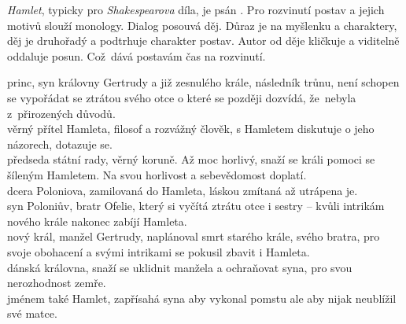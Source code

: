 \documentclass[../main.tex]{subfiles}
\begin{document}


\noindent\textit{Hamlet}, typicky pro \textit{Shakespearova} díla, je psán .
Pro rozvinutí postav a jejich motivů slouží monology.
Dialog posouvá děj.
Důraz je na myšlenku a charaktery, děj je druhořadý a podtrhuje charakter postav.
Autor od děje kličkuje a viditelně oddaluje posun.
Což~dává postavám čas na rozvinutí.

\noindent 
{} princ, syn královny Gertrudy a již zesnulého krále,
následník trůnu, není schopen se vypořádat se ztrátou svého otce o které se později dozvídá,
že~nebyla z~přirozených důvodů. \\
 věrný přítel Hamleta, filosof a rozvážný člověk,
s Hamletem diskutuje o jeho názorech, dotazuje se. \\
 předseda státní rady, věrný koruně. Až moc horlivý,
snaží se králi pomoci se šíleným Hamletem. Na svou horlivost a sebevědomost doplatí. \\
 dcera Poloniova, zamilovaná do Hamleta, láskou zmítaná až utrápena je. \\
 syn Poloniův, bratr Ofelie, který si vyčítá ztrátu otce i sestry
-- kvůli intrikám nového krále nakonec zabíjí Hamleta. \\
 nový král, manžel Gertrudy, naplánoval smrt starého krále,
svého bratra, pro svoje obohacení a svými intrikami se pokusil zbavit i Hamleta. \\
 dánská královna, snaží se uklidnit manžela a ochraňovat syna,
pro svou nerozhodnost zemře. \\
 jménem také Hamlet,
zapřísahá syna aby vykonal pomstu ale aby nijak neublížil své matce.
\end{document}
